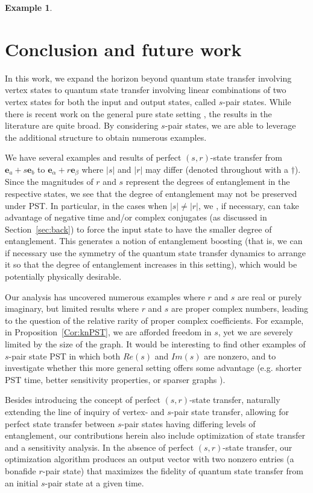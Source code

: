\documentclass{article}
\numberwithin{equation}{section}
\newtheorem{ex}[lemma]{Example}
\newcommand{\be}{\mathbf e}
\begin{document}
{\begin{ex}
\end{ex}


\section{Conclusion and future work}\label{sec:concl}
In this work, we expand the horizon beyond quantum state transfer involving vertex states to quantum state transfer involving linear combinations of two vertex states for both the input and output states, called $s$-pair states. While there is recent work on the general pure state setting \cite{godsil2025perfect}, the results in the literature are quite broad. By considering $s$-pair states, we are able to leverage the additional structure to obtain numerous examples. 



We have several examples and results of perfect $(s, r)$-state transfer from $\be_a + s\be_b$ to 
 $\be_\alpha + r\be_\beta$ where $|s|$ and $ |r|$ may differ (denoted throughout with a $\dagger$). Since the magnitudes of $r$ and $s$ represent the degrees of entanglement  in the respective states, we see that  the degree of entanglement may not be preserved under PST.  In particular, in the cases when $|s|\neq |r|$, we , if necessary, can take advantage of negative time and/or complex conjugates (as discussed in Section~\ref{sec:back})  to force the input state to have the smaller degree of entanglement. This generates a notion of entanglement boosting (that is, we can if necessary use the symmetry of the quantum state transfer dynamics to arrange it so that the degree of entanglement increases in this setting), which would be potentially physically desirable.  

 
 Our analysis has uncovered numerous examples where $r$ and $s$ are real or purely imaginary, but limited results where $r$ and $s$ are proper complex numbers, leading to the question of the relative rarity of proper complex coefficients. For example, in Proposition~\ref{Cor:knPST}, we are afforded freedom in $s$, yet we are severely limited by the size of the graph. It would be interesting to find other examples of $s$-pair state PST in which both $Re(s)$ and $Im(s)$ are nonzero, and to investigate whether this more general setting offers some advantage (e.g. shorter PST time, better sensitivity properties, or sparser graphs ). 

 Besides introducing the concept of perfect $(s,r)$-state transfer, naturally extending the line of inquiry of vertex- and $s$-pair state transfer, allowing for perfect state transfer between $s$-pair states having differing levels of entanglement,  our contributions herein also include  optimization of state transfer and a sensitivity analysis. In the absence of perfect $(s,r)$-state transfer, our optimization algorithm produces an output vector with two nonzero entries (a bonafide $r$-pair state) that maximizes the fidelity of quantum state transfer from an initial $s$-pair state at a given time. 
 
}
\end{document}
